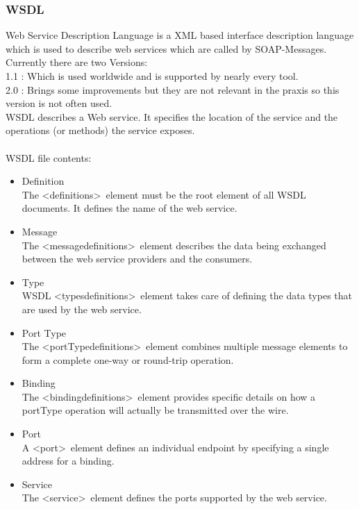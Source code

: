 \documentclass[12pt]{article}
\begin{document}
	
\subsubsection{WSDL}
\label{sec:wsdl}
Web Service Description Language is a XML based interface description language
which is used to describe web services which are called by SOAP-Messages.
Currently there are two Versions:\\
1.1 : Which is used worldwide and is supported by nearly every tool. \\
2.0 : Brings some improvements but they are not relevant in the praxis so this version is not often
used.\\
WSDL describes a Web service. It specifies the location of the service and the operations (or methods) the service exposes.\\
\\
WSDL file contents:
\begin{itemize}
\item Definition \\
The \textless definitions\textgreater ~element must be the root element of all WSDL documents. It defines the name of the web service.
\item Message \\
The \textless messagedefinitions\textgreater ~element describes the data being exchanged between the web service providers and the consumers.
\item Type \\
WSDL \textless typesdefinitions\textgreater ~element takes care of defining the data types that are used by the web service.
\item Port Type  \\
The \textless portTypedefinitions\textgreater ~element combines multiple message elements to form a complete one-way or round-trip operation.
\item Binding \\
The \textless bindingdefinitions\textgreater ~element provides specific details on how a portType operation will actually be transmitted over the wire.
\item Port \\
A \textless port\textgreater ~element defines an individual endpoint by specifying a single address for a binding. 
\item Service \\
The \textless service\textgreater ~element defines the ports supported by the web service.
\end{itemize}
\cite{wsdl}
\end{document}
